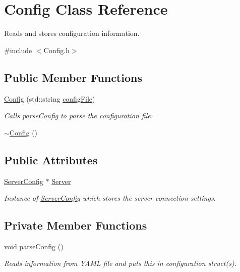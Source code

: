 \hypertarget{classConfig}{\section{Config Class Reference}
\label{classConfig}
}


Reads and stores configuration information.  




{\ttfamily \#include $<$Config.\-h$>$}

\subsection*{Public Member Functions}
\begin{DoxyCompactItemize}
\item 
\hyperlink{classConfig_ae67e338ea42e242cb5b374b6583c8b1c}{Config} (std\-::string \hyperlink{classConfig_a08b7b2c4eadf7dda51404f76fd6e0280}{config\-File})
\begin{DoxyCompactList}\small\item\em Calls parse\-Config to parse the configuration file. \end{DoxyCompactList}\item 
\hyperlink{classConfig_a543dce59b66475c5108088ee4ce1cdfc}{$\sim$\-Config} ()
\end{DoxyCompactItemize}
\subsection*{Public Attributes}
\begin{DoxyCompactItemize}
\item 
\hypertarget{classConfig_a249a19a298cdcfd4223609142e15e5de}{\hyperlink{structServerConfig}{Server\-Config} $\ast$ \hyperlink{classConfig_a249a19a298cdcfd4223609142e15e5de}{Server}}\label{classConfig_a249a19a298cdcfd4223609142e15e5de}

\begin{DoxyCompactList}\small\item\em Instance of \hyperlink{structServerConfig}{Server\-Config} which stores the server connection settings. \end{DoxyCompactList}\end{DoxyCompactItemize}
\subsection*{Private Member Functions}
\begin{DoxyCompactItemize}
\item 
\hypertarget{classConfig_a2ddcecec4284da0fb0b53da77e0d217a}{void \hyperlink{classConfig_a2ddcecec4284da0fb0b53da77e0d217a}{parse\-Config} ()}\label{classConfig_a2ddcecec4284da0fb0b53da77e0d217a}

\begin{DoxyCompactList}\small\item\em Reads information from Y\-A\-M\-L file and puts this in configuration struct(s). \end{DoxyCompactList}\end{DoxyCompactItemize}

